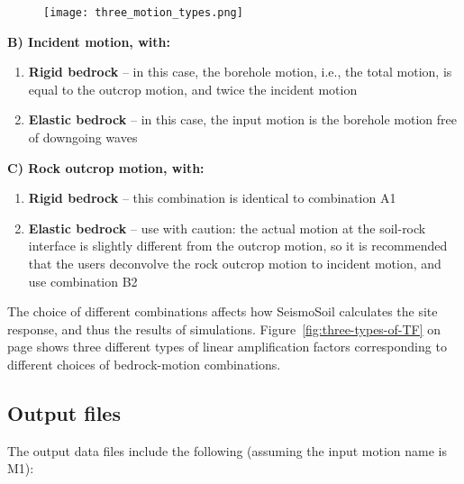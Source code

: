 \documentclass[11pt,letterpaper]{article}
\begin{document}
\begin{figure}
\begin{center}
  \texttt{[image: three\_motion\_types.png]}\\
\end{center}
\end{figure}

\noindent\textbf{B) Incident motion, with:}
\vspace{-10pt}
\begin{enumerate}
\item \textbf{Rigid bedrock} -- in this case, the borehole motion, i.e., the total motion, is equal to the outcrop motion, and twice the incident motion
\item \textbf{Elastic bedrock} -- in this case, the input motion is the borehole motion free of downgoing waves
\end{enumerate}

\noindent\textbf{C) Rock outcrop motion, with:}
\vspace{-10pt}
\begin{enumerate}
\item \textbf{Rigid bedrock} -- this combination is identical to combination A1
\item \textbf{Elastic bedrock} -- use with caution: the actual motion at the soil-rock interface is slightly different from the outcrop motion, so it is recommended that the users deconvolve the rock outcrop motion to incident motion, and use combination B2
\end{enumerate}

The choice of different combinations affects how SeismoSoil calculates the site response, and thus the results of simulations. Figure~\ref{fig:three-types-of-TF} on page \pageref{fig:three-types-of-TF} shows three different types of linear amplification factors corresponding to different choices of bedrock-motion combinations.





\newpage
\subsection{Output files}

The output data files include the following (assuming the input motion name is M1):
\end{document}
